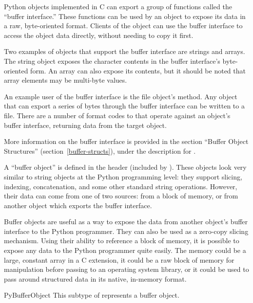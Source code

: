 Python objects implemented in C can export a group of functions called
the ``buffer interface.''  These functions can
be used by an object to expose its data in a raw, byte-oriented
format. Clients of the object can use the buffer interface to access
the object data directly, without needing to copy it first.

Two examples of objects that support
the buffer interface are strings and arrays. The string object exposes
the character contents in the buffer interface's byte-oriented
form. An array can also expose its contents, but it should be noted
that array elements may be multi-byte values.

An example user of the buffer interface is the file object's
 method. Any object that can export a series of bytes
through the buffer interface can be written to a file. There are a
number of format codes to  that operate
against an object's buffer interface, returning data from the target
object.

More information on the buffer interface is provided in the section
``Buffer Object Structures'' (section~\ref{buffer-structs}), under
the description for .

A ``buffer object'' is defined in the  header
(included by ). These objects look very similar to
string objects at the Python programming level: they support slicing,
indexing, concatenation, and some other standard string
operations. However, their data can come from one of two sources: from
a block of memory, or from another object which exports the buffer
interface.

Buffer objects are useful as a way to expose the data from another
object's buffer interface to the Python programmer. They can also be
used as a zero-copy slicing mechanism. Using their ability to
reference a block of memory, it is possible to expose any data to the
Python programmer quite easily. The memory could be a large, constant
array in a C extension, it could be a raw block of memory for
manipulation before passing to an operating system library, or it
could be used to pass around structured data in its native, in-memory
format.

\begin{ctypedesc}{PyBufferObject}
  This subtype of  represents a buffer object.
\end{ctypedesc}

